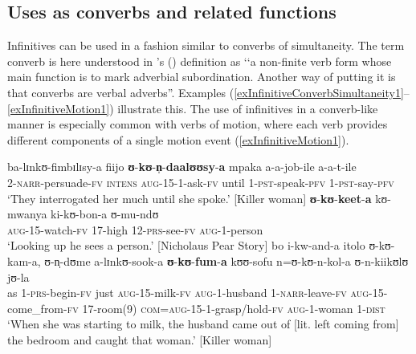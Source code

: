 \subsection{Uses as converbs and related functions}\label{VerbalNounsConverbsAndRelated}
Infinitives can be used in a fashion similar to converbs of simultaneity. The term converb is here understood in \citeauthor{HaspelmathM1995}'s (\citeyear[3]{HaspelmathM1995}) definition as \lq\lq a non-finite verb form whose main function is to mark adverbial subordination. Another way of putting it is that converbs are verbal adverbs''. Examples (\ref{exInfinitiveConverbSimultaneity1}--\ref{exInfinitiveMotion1}) illustrate this. The use of infinitives in a converb-like manner is especially common with verbs of motion, where each verb provides different components of a single motion event (\ref{exInfinitiveMotion1}).
\begin{exe}
\ex \label{exInfinitiveConverbSimultaneity1}\gll ba-lɪnkʊ-fimbɪlɪsy-a fiijo \textbf{ʊ}-\textbf{kʊ}-\textbf{n̩}-\textbf{daalʊʊsy}-\textbf{a} mpaka a-a-job-ile a-a-t-ile\\
2-\textsc{narr}-persuade-\textsc{fv} \textsc{intens} \textsc{aug}-15-1-ask-\textsc{fv} until 1-\textsc{pst}-speak-\textsc{pfv} 1-\textsc{pst}-say-\textsc{pfv}\\
\glt `They interrogated her much until she spoke.' [Killer woman]
\ex \label{exInfinitiveConverbSimultaneity2}\gll \textbf{ʊ}-\textbf{kʊ}-\textbf{keet}-\textbf{a} kʊ-mwanya ki-kʊ-bon-a ʊ-mu-ndʊ\\
\textsc{aug}-15-watch-\textsc{fv} 17-high 12-\textsc{prs}-see-\textsc{fv} \textsc{aug}-1-person\\
\glt \lq Looking up he sees a person.' [Nicholaus Pear Story]
\ex \label{exInfinitiveMotion1}\gll bo i-kw-and-a itolo ʊ-kʊ-kam-a, ʊ-n̩-dʊme a-lɪnkʊ-sook-a \textbf{ʊ}-\textbf{kʊ}-\textbf{fum}-\textbf{a} kʊʊ-sofu n=ʊ-kʊ-n-kol-a ʊ-n-kiikʊlʊ jʊ-la\\
as 1-\textsc{prs}-begin-\textsc{fv} just \textsc{aug}-15-milk-\textsc{fv} \textsc{aug}-1-husband 1-\textsc{narr}-leave-\textsc{fv} \textsc{aug}-15-come\_from-\textsc{fv} 17-room(9) \textsc{com}=\textsc{aug}-15-1-grasp/hold-\textsc{fv} \textsc{aug}-1-woman 1-\textsc{dist}\\
\glt `When she was starting to milk, the husband came out of [lit. left coming from] the bedroom and caught that woman.' [Killer woman]
\end{exe}

